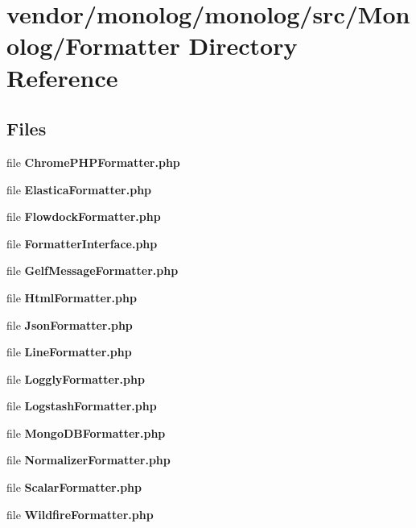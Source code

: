 \section{vendor/monolog/monolog/src/\+Monolog/\+Formatter Directory Reference}
\label{dir_530b47ba9f3e726f0d146fdb15587054}
\subsection*{Files}
\begin{DoxyCompactItemize}
\item 
file {\bf Chrome\+P\+H\+P\+Formatter.\+php}
\item 
file {\bf Elastica\+Formatter.\+php}
\item 
file {\bf Flowdock\+Formatter.\+php}
\item 
file {\bf Formatter\+Interface.\+php}
\item 
file {\bf Gelf\+Message\+Formatter.\+php}
\item 
file {\bf Html\+Formatter.\+php}
\item 
file {\bf Json\+Formatter.\+php}
\item 
file {\bf Line\+Formatter.\+php}
\item 
file {\bf Loggly\+Formatter.\+php}
\item 
file {\bf Logstash\+Formatter.\+php}
\item 
file {\bf Mongo\+D\+B\+Formatter.\+php}
\item 
file {\bf Normalizer\+Formatter.\+php}
\item 
file {\bf Scalar\+Formatter.\+php}
\item 
file {\bf Wildfire\+Formatter.\+php}
\end{DoxyCompactItemize}
